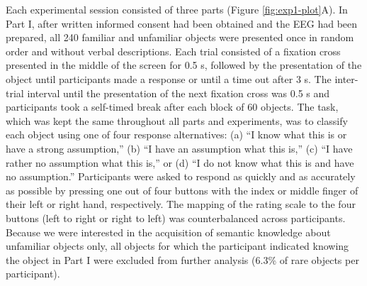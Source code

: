\documentclass[
  english,
  man,11pt,floatsintext]{apa7}
\begin{document}
Each experimental session consisted of three parts (Figure \ref{fig:exp1-plot}A). In Part I, after written informed consent had been obtained and the EEG had been prepared, all 240 familiar and unfamiliar objects were presented once in random order and without verbal descriptions. Each trial consisted of a fixation cross presented in the middle of the screen for 0.5 s, followed by the presentation of the object until participants made a response or until a time out after 3 s. The inter-trial interval until the presentation of the next fixation cross was 0.5 s and participants took a self-timed break after each block of 60 objects. The task, which was kept the same throughout all parts and experiments, was to classify each object using one of four response alternatives: (a) ``I know what this is or have a strong assumption,'' (b) ``I have an assumption what this is,'' (c) ``I have rather no assumption what this is,'' or (d) ``I do not know what this is and have no assumption.'' Participants were asked to respond as quickly and as accurately as possible by pressing one out of four buttons with the index or middle finger of their left or right hand, respectively. The mapping of the rating scale to the four buttons (left to right or right to left) was counterbalanced across participants. Because we were interested in the acquisition of semantic knowledge about unfamiliar objects only, all objects for which the participant indicated knowing the object in Part I were excluded from further analysis (6.3\% of rare objects per participant).
\end{document}
